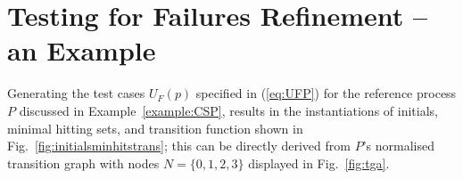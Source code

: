 \section{Testing for Failures Refinement -- an Example}
\label{sec:case}
 
Generating the test cases $U_F(p)$ specified in  (\ref{eq:UFP}) for the reference
process $P$ discussed in Example~\ref{example:CSP},
results in the   instantiations of initials, minimal hitting sets, and
transition function shown in Fig.~\ref{fig:initialsminhitstrans}; 
this can be directly derived from $P$'s normalised
transition graph with nodes $N =\{0,1,2,3\}$ displayed in Fig.~\ref{fig:tga}.


